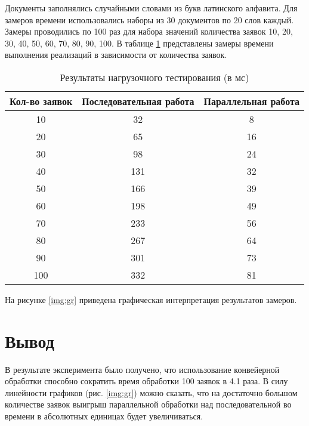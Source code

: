 Документы заполнялись случайными словами из букв латинского алфавита. Для замеров времени использовались наборы из 30 документов по 20 слов каждый.
Замеры проводились по 100 раз для набора значений количества заявок {10, 20, 30, 40, 50, 60, 70, 80, 90, 100}.
В таблице \ref{tbl:threads} представлены замеры времени выполнения реализаций в зависимости от количества заявок.


\begin{table}[h]
	\begin{center}
		\begin{threeparttable}
			\caption{Результаты нагрузочного тестирования (в мс)}
			\label{tbl:threads}
			\begin{tabular}{|c|c|c|}
				\hline
				{Кол-во заявок} & {Последовательная работа} &{Параллельная работа} \\
				\hline
				 10 &32&8\\
				\hline
				 20 &65&16\\
				 \hline
				 30 &98&24\\
				 \hline
				 40 &131&32\\
				 \hline
				 50 &166&39\\
				 \hline
				 60 &198&49\\
				 \hline
				 70 &233&56\\
				 \hline
				 80 &267&64\\
				 \hline
				 90 &301&73\\
				 \hline
				 100 &332&81\\
				\hline
				
			\end{tabular}
		\end{threeparttable}
	\end{center}
\end{table}

\clearpage
На рисунке \ref{img:gr} приведена графическая интерпретация результатов замеров.




\section*{Вывод}

В результате эксперимента было получено, что использование конвейерной обработки способно сократить время обработки 100 заявок в 4.1 раза.
В силу линейности графиков (рис. \ref{img:gr}) можно сказать, что на достаточно большом количестве заявок выигрыш параллельной обработки над последовательной во времени в абсолютных единицах будет увеличиваться.


